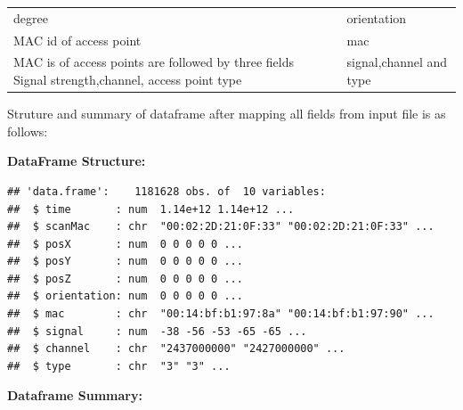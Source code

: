 \documentclass[
]{article}
\begin{document}
\begin{longtable}[]{@{}lcl@{}}
\begin{minipage}[t]{0.25\columnwidth}
degree\strut
\end{minipage} & \begin{minipage}[t]{0.22\columnwidth}\centering
1\strut
\end{minipage} & \begin{minipage}[t]{0.44\columnwidth}\raggedright
orientation\strut
\end{minipage}\tabularnewline
\begin{minipage}[t]{0.25\columnwidth}\raggedright
MAC id of access point\strut
\end{minipage} & \begin{minipage}[t]{0.22\columnwidth}\centering
1\strut
\end{minipage} & \begin{minipage}[t]{0.44\columnwidth}\raggedright
mac\strut
\end{minipage}\tabularnewline
\begin{minipage}[t]{0.25\columnwidth}\raggedright
MAC is of access points are followed by three fields Signal
strength,channel, access point type\strut
\end{minipage} & \begin{minipage}[t]{0.22\columnwidth}\centering
3\strut
\end{minipage} & \begin{minipage}[t]{0.44\columnwidth}\raggedright
signal,channel and type\strut
\end{minipage}\tabularnewline
\bottomrule
\end{longtable}

Struture and summary of dataframe after mapping all fields from input
file is as follows:

\textbf{DataFrame Structure:}

\begin{verbatim}
## 'data.frame':    1181628 obs. of  10 variables:
##  $ time       : num  1.14e+12 1.14e+12 ...
##  $ scanMac    : chr  "00:02:2D:21:0F:33" "00:02:2D:21:0F:33" ...
##  $ posX       : num  0 0 0 0 0 ...
##  $ posY       : num  0 0 0 0 0 ...
##  $ posZ       : num  0 0 0 0 0 ...
##  $ orientation: num  0 0 0 0 0 ...
##  $ mac        : chr  "00:14:bf:b1:97:8a" "00:14:bf:b1:97:90" ...
##  $ signal     : num  -38 -56 -53 -65 -65 ...
##  $ channel    : chr  "2437000000" "2427000000" ...
##  $ type       : chr  "3" "3" ...
\end{verbatim}

\textbf{Dataframe Summary:}
\end{document}
